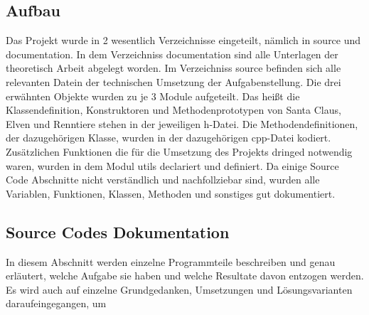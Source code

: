 \documentclass[a4paper,12pt]{exam}
\begin{document}
\subsection{Aufbau}
Das Projekt wurde in 2 wesentlich Verzeichnisse eingeteilt, nämlich in source und documentation. In dem Verzeichniss documentation sind alle Unterlagen der theoretisch Arbeit 
abgelegt worden. Im Verzeichniss source befinden sich alle relevanten Datein der technischen Umsetzung der Aufgabenstellung.
Die drei erwähnten Objekte wurden zu je 3 Module aufgeteilt.
Das heißt die Klassendefinition, Konstruktoren und Methodenprototypen von Santa Claus, Elven und Renntiere stehen in der jeweiligen h-Datei. Die Methodendefinitionen, der dazugehörigen Klasse,
wurden in der dazugehörigen cpp-Datei kodiert. Zusätzlichen Funktionen die für die Umsetzung des Projekts dringed notwendig waren, wurden in dem Modul utils declariert und definiert.
Da einige Source Code Abschnitte nicht verständlich und nachfollziebar sind, wurden alle Variablen, Funktionen, Klassen, Methoden und sonstiges gut dokumentiert.\\
\subsection{Source Codes Dokumentation}
In diesem Abschnitt werden einzelne Programmteile beschreiben und genau erläutert, welche Aufgabe sie haben und welche Resultate davon entzogen werden.
Es wird auch auf einzelne Grundgedanken, Umsetzungen und Lösungsvarianten daraufeingegangen, um 
\end{document}
